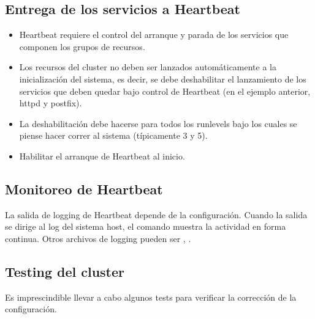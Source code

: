 \subsection{Entrega de los servicios a Heartbeat}
\begin{itemize}
	\item Heartbeat requiere el control del arranque y parada de los servicios que componen los grupos de recursos. 
	\item Los recursos del cluster no deben ser lanzados automáticamente a la inicialización del sistema, es decir, se debe deshabilitar el lanzamiento de los servicios que deben quedar bajo control de Heartbeat (en el ejemplo anterior, httpd y postfix).
	\item La deshabilitación debe hacerse para todos los runlevels bajo los cuales se piense hacer correr al sistema (típicamente 3 y 5).
	\item Habilitar el arranque de Heartbeat al inicio.
\end{itemize}

\subsection{Monitoreo de Heartbeat}

La salida de logging de Heartbeat depende de la configuración. Cuando la salida se dirige al log del sistema host, el comando  muestra la actividad en forma continua. Otros archivos de logging pueden ser , .


\subsection{Testing del cluster}
Es imprescindible llevar a cabo algunos tests para verificar la corrección de la configuración.

